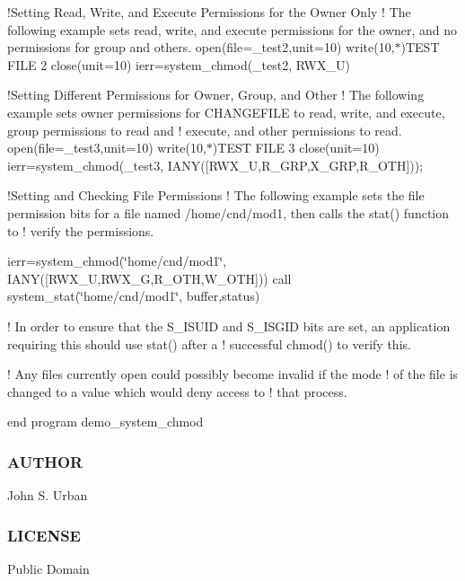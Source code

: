 !\+Setting Read, Write, and Execute Permissions for the Owner Only ! The following example sets read, write, and execute permissions for the owner, and no permissions for group and others. open(file=\textquotesingle{}\+\_\+test2\textquotesingle{},unit=10) write(10,$\ast$)\textquotesingle{}T\+E\+ST F\+I\+LE 2\textquotesingle{} close(unit=10) ierr=system\+\_\+chmod(\textquotesingle{}\+\_\+test2\textquotesingle{}, R\+W\+X\+\_\+U)

!\+Setting Different Permissions for Owner, Group, and Other ! The following example sets owner permissions for C\+H\+A\+N\+G\+E\+F\+I\+LE to read, write, and execute, group permissions to read and ! execute, and other permissions to read. open(file=\textquotesingle{}\+\_\+test3\textquotesingle{},unit=10) write(10,$\ast$)\textquotesingle{}T\+E\+ST F\+I\+LE 3\textquotesingle{} close(unit=10) ierr=system\+\_\+chmod(\textquotesingle{}\+\_\+test3\textquotesingle{}, I\+A\+N\+Y(\mbox{[}\+R\+W\+X\+\_\+\+U,\+R\+\_\+\+G\+R\+P,\+X\+\_\+\+G\+R\+P,\+R\+\_\+\+O\+T\+H\mbox{]}));

!\+Setting and Checking File Permissions ! The following example sets the file permission bits for a file named /home/cnd/mod1, then calls the stat() function to ! verify the permissions.

ierr=system\+\_\+chmod(\char`\"{}home/cnd/mod1\char`\"{}, I\+A\+N\+Y(\mbox{[}\+R\+W\+X\+\_\+\+U,\+R\+W\+X\+\_\+\+G,\+R\+\_\+\+O\+T\+H,\+W\+\_\+\+O\+T\+H\mbox{]})) call system\+\_\+stat(\char`\"{}home/cnd/mod1\char`\"{}, buffer,status)

! In order to ensure that the S\+\_\+\+I\+S\+U\+ID and S\+\_\+\+I\+S\+G\+ID bits are set, an application requiring this should use stat() after a ! successful chmod() to verify this.

! Any files currently open could possibly become invalid if the mode ! of the file is changed to a value which would deny access to ! that process.

end program demo\+\_\+system\+\_\+chmod

\subsubsection*{A\+U\+T\+H\+OR}

John S. Urban \subsubsection*{L\+I\+C\+E\+N\+SE}

Public Domain 

